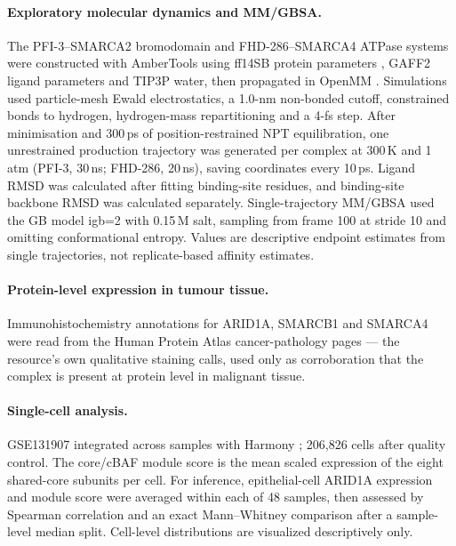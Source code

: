 \documentclass[11pt,a4paper]{article}
\begin{document}
\paragraph{Exploratory molecular dynamics and MM/GBSA.} The PFI-3--SMARCA2
bromodomain and FHD-286--SMARCA4 ATPase systems were constructed with AmberTools
using ff14SB protein parameters \citep{maier2015}, GAFF2 ligand parameters and
TIP3P water, then propagated in OpenMM \citep{eastman2017}. Simulations used
particle-mesh Ewald electrostatics, a 1.0-nm non-bonded cutoff, constrained bonds
to hydrogen, hydrogen-mass repartitioning and a 4-fs step. After minimisation and
300\,ps of position-restrained NPT equilibration, one unrestrained production
trajectory was generated per complex at 300\,K and 1\,atm (PFI-3, 30\,ns;
FHD-286, 20\,ns), saving coordinates every 10\,ps. Ligand RMSD was calculated
after fitting binding-site residues, and binding-site backbone RMSD was
calculated separately. Single-trajectory MM/GBSA \citep{miller2012} used the
GB model igb=2 with 0.15\,M salt, sampling from frame 100 at stride 10 and
omitting conformational entropy. Values are descriptive endpoint estimates from
single trajectories, not replicate-based affinity estimates.

\paragraph{Protein-level expression in tumour tissue.} Immunohistochemistry
annotations for ARID1A, SMARCB1 and SMARCA4 were read from the Human Protein
Atlas cancer-pathology pages \citep{hpa2015} --- the resource's own qualitative
staining calls, used only as corroboration that the complex is present at protein
level in malignant tissue.

\paragraph{Single-cell analysis.} GSE131907 \citep{kim2020} integrated across
samples with Harmony \citep{korsunsky2019}; 206{,}826 cells after quality control.
The core/cBAF module score is the mean scaled expression of the eight shared-core
subunits per cell. For inference, epithelial-cell ARID1A expression and module
score were averaged within each of 48 samples, then assessed by Spearman
correlation and an exact Mann--Whitney comparison after a sample-level median
split. Cell-level distributions are visualized descriptively only.
\end{document}
